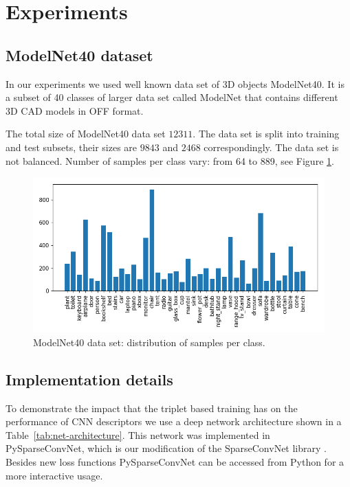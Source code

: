 \section{Experiments}
\label{sec:4}
\subsection{ModelNet40 dataset}
In our experiments we used well known data set of 3D objects ModelNet40.
It is a subset of 40 classes of larger data set called ModelNet \cite{wu20153d} that contains different 3D CAD models in OFF format.

The total size of ModelNet40 data set $12311$.
The data set is split into training and test subsets, their sizes are $9843$ and $2468$ correspondingly.
The data set is not balanced.
Number of samples per class vary: from 64 to 889, see Figure \ref{fig:modelnet_classes}.

\begin{figure}
	\centering
    \includegraphics[width=\textwidth]{Figures/shape_retrieval/modelnet_classes.png}
    \caption{ModelNet40 data set: distribution of samples per class.}
    \label{fig:modelnet_classes}
\end{figure}

\subsection{Implementation details}
To demonstrate the impact that the triplet based training has on the performance of CNN descriptors
we use a deep network architecture shown in a Table~\ref{tab:net-architecture}. This network was implemented in PySparseConvNet, which is our modification of the SparseConvNet library \cite{graham2014spatially}. Besides new loss functions PySparseConvNet can be accessed from Python for a more interactive usage.

